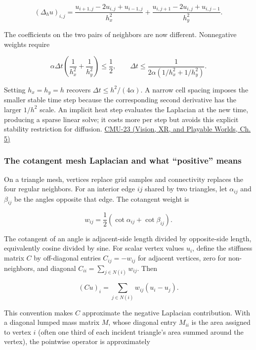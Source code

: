 \[
(\Delta_hu)_{i,j}=
\frac{u_{i+1,j}-2u_{i,j}+u_{i-1,j}}{h_x^2}
+\frac{u_{i,j+1}-2u_{i,j}+u_{i,j-1}}{h_y^2}.
\]

The coefficients on the two pairs of neighbors are now different. Nonnegative weights require

\[
\alpha\Delta t\left(\frac{1}{h_x^2}+\frac{1}{h_y^2}\right)\le\frac12,
\qquad
\Delta t\le\frac{1}{2\alpha(1/h_x^2+1/h_y^2)}.
\]

Setting \(h_x=h_y=h\) recovers \(\Delta t\le h^2/(4\alpha)\). A narrow cell spacing imposes the smaller stable time step because the corresponding second derivative has the larger \(1/h^2\) scale. An implicit heat step evaluates the Laplacian at the new time, producing a sparse linear solve; it costs more per step but avoids this explicit stability restriction for diffusion. \href{../07-Vision-XR-and-Playable-Worlds/main.pdf\#nameddest=04-visual-computing-ii-ch036-cmu-23---physically-based-animation-and-pdes}{CMU-23 (Vision, XR, and Playable Worlds, Ch. 5)}

\subsubsection{The cotangent mesh Laplacian and what ``positive'' means}\label{04-visual-computing-ii-ch030-the-cotangent-mesh-laplacian-and-what-positive-means}

\hypertarget{04-visual-computing-ii-ch030-the-cotangent-mesh-laplacian-and-what-positive-means}{}

On a triangle mesh, vertices replace grid samples and connectivity replaces the four regular neighbors. For an interior edge \(ij\) shared by two triangles, let \(\alpha_{ij}\) and \(\beta_{ij}\) be the angles opposite that edge. The cotangent weight is

\[
w_{ij}=\frac12(\cot\alpha_{ij}+\cot\beta_{ij}).
\]

The cotangent of an angle is adjacent-side length divided by opposite-side length, equivalently cosine divided by sine. For scalar vertex values \(u_i\), define the stiffness matrix \(C\) by off-diagonal entries \(C_{ij}=-w_{ij}\) for adjacent vertices, zero for non-neighbors, and diagonal \(C_{ii}=\sum_{j\in N(i)}w_{ij}\). Then

\[
(Cu)_i=\sum_{j\in N(i)}w_{ij}(u_i-u_j).
\]

This convention makes \(C\) approximate the negative Laplacian contribution. With a diagonal lumped mass matrix \(M\), whose diagonal entry \(M_{ii}\) is the area assigned to vertex \(i\) (often one third of each incident triangle's area summed around the vertex), the pointwise operator is approximately

